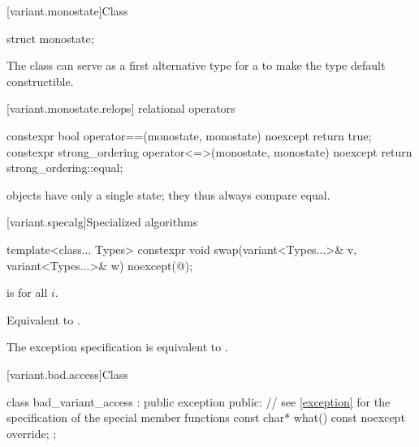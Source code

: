 [variant.monostate]{Class }%
%

%
\begin{itemdecl}
struct monostate{};
\end{itemdecl}

\begin{itemdescr}
\pnum
The class  can serve as a first alternative type for
a  to make the  type default constructible.
\end{itemdescr}


[variant.monostate.relops]{ relational operators}

%
%
\begin{itemdecl}
constexpr bool operator==(monostate, monostate) noexcept { return true; }
constexpr strong_ordering operator<=>(monostate, monostate) noexcept
{ return strong_ordering::equal; }
\end{itemdecl}

\begin{itemdescr}
\pnum
\begin{note}
 objects have only a single state; they thus always compare equal.
\end{note}
\end{itemdescr}

[variant.specalg]{Specialized algorithms}

%
\begin{itemdecl}
template<class... Types>
  constexpr void swap(variant<Types...>& v, variant<Types...>& w) noexcept(@\seebelow@);
\end{itemdecl}

\begin{itemdescr}
\pnum
\constraints
{}
is  for all $i$.

\pnum
\effects
Equivalent to .

\pnum
\remarks
The exception specification is equivalent to .
\end{itemdescr}

[variant.bad.access]{Class }%
%

\begin{codeblock}
class bad_variant_access : public exception {
public:
  // see \ref{exception} for the specification of the special member functions
  const char* what() const noexcept override;
};
\end{codeblock}


